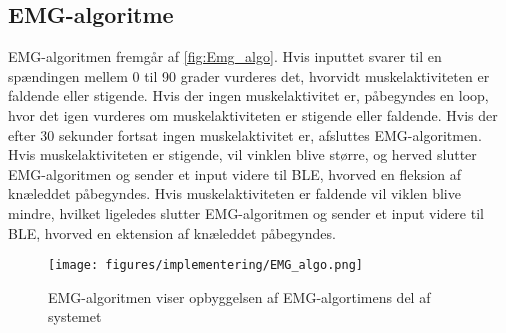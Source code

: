 \subsection{EMG-algoritme}
EMG-algoritmen fremgår af \autoref{fig:Emg_algo}. Hvis inputtet svarer til en spændingen mellem 0 til 90 grader vurderes det, hvorvidt muskelaktiviteten er faldende eller stigende. Hvis der ingen muskelaktivitet er, påbegyndes en loop, hvor det igen vurderes om muskelaktiviteten er stigende eller faldende. Hvis der efter 30 sekunder fortsat ingen muskelaktivitet er, afsluttes EMG-algoritmen. Hvis muskelaktiviteten er stigende, vil vinklen blive større, og herved slutter EMG-algoritmen og sender et input videre til BLE, hvorved en fleksion af knæleddet påbegyndes. Hvis muskelaktiviteten er faldende vil viklen blive mindre, hvilket ligeledes slutter EMG-algoritmen og sender et input videre til BLE, hvorved en ektension af knæleddet påbegyndes. 
\begin{figure}[H]
\centering
\texttt{[image: figures/implementering/EMG\_algo.png]}
\caption{EMG-algoritmen viser opbyggelsen af EMG-algortimens del af systemet}
\label{fig:Emg_algo}
\end{figure}

